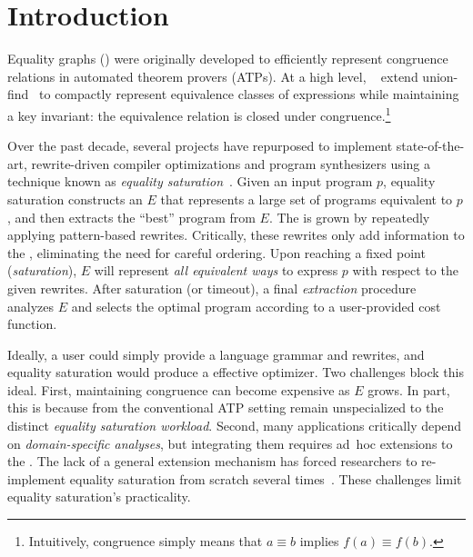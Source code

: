 \section{Introduction}
\label{sec:intro}

Equality graphs (\egraphs) were originally developed to
  efficiently represent congruence relations
  in automated theorem provers (ATPs).
At a high level, \egraphs~\cite{nelson, pp-congr}
  extend union-find~\cite{unionfind} to compactly represent
  equivalence classes of expressions while
  maintaining a key invariant:
  the equivalence relation is closed under congruence.\footnote{
    Intuitively, congruence simply means
    that $a \equiv b$ implies $f(a) \equiv f(b)$.}

Over the past decade, several projects have repurposed \egraphs
  to implement state-of-the-art, rewrite-driven
  compiler optimizations and program synthesizers
  using a technique known as \textit{equality saturation}~\cite{
    denali, eqsat, eqsat-llvm, szalinski, yogo-pldi20, spores, herbie}.
Given an input program $p$,
  equality saturation constructs an \egraph $E$ that
  represents a large set of programs equivalent to $p$,
  and then extracts the ``best'' program from $E$.
The \egraph is grown by repeatedly applying
  pattern-based rewrites. %
Critically, these rewrites only add information to the \egraph,
  eliminating the need for careful ordering.
Upon reaching a fixed point (\textit{saturation}),
  $E$ will represent \textit{all equivalent ways} to
  express $p$ with respect to the given rewrites.
After saturation (or timeout),
  a final \textit{extraction} procedure
  analyzes $E$ and selects the
  optimal program according to
  a user-provided cost function.

Ideally, a user could simply provide
  a language grammar and rewrites,
  and equality saturation would produce a effective optimizer.
Two challenges block this ideal.
First, maintaining congruence can become expensive as $E$ grows.
In part, this is because \egraphs from the conventional ATP setting
  remain unspecialized to the distinct \textit{equality saturation workload}.
Second, many applications critically depend on
  \textit{domain-specific analyses}, but
  integrating them requires ad~hoc extensions to the \egraph.
The lack of a general extension mechanism
  has forced researchers to re-implement
  equality saturation from scratch several times~\cite{herbie, eqsat, wu_siga19}.
These challenges limit equality saturation's practicality.

